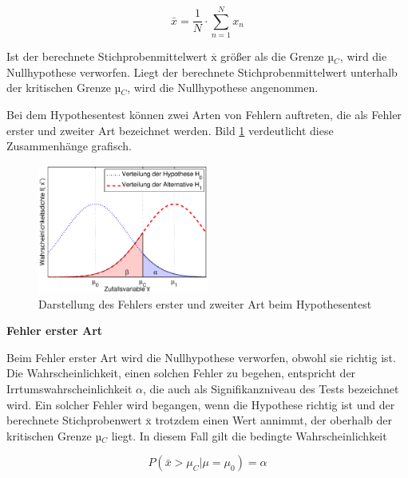 \begin{equation}\label{eq:sixfiftysix}
\bar{x}=\dfrac{1}{N} \cdot \sum _{n=1}^{N}x_{n}
\end{equation}

\noindent Ist der berechnete Stichprobenmittelwert $\overline{\mathrm{x}}$ gr\"{o}{\ss}er als die Grenze µ$_{C}$, wird die Nullhypothese verworfen. Liegt der berechnete Stichprobenmittelwert unterhalb der kritischen Grenze µ$_{C}$, wird die Nullhypothese angenommen.\newline

\noindent Bei dem Hypothesentest k\"{o}nnen zwei Arten von Fehlern auftreten, die als Fehler erster und zweiter Art bezeichnet werden. Bild \ref{fig:HypothesentestFehler} verdeutlicht diese Zusammenh\"{a}nge grafisch.

\noindent 
\begin{figure}[H]
  \centerline{\includegraphics[width=0.5\textwidth]{Kapitel6/Bilder/image9}}
  \caption{Darstellung des Fehlers erster und zweiter Art beim Hypothesentest}
  \label{fig:HypothesentestFehler}
\end{figure}

\clearpage

{\selectfont
\noindent\textbf{Fehler erster Art}}\smallskip

\noindent Beim Fehler erster Art wird die Nullhypothese verworfen, obwohl sie richtig ist. Die Wahrscheinlichkeit, einen solchen Fehler zu begehen, entspricht der Irrtumswahrscheinlichkeit $\alpha$, die auch als Signifikanzniveau des Tests bezeichnet wird. Ein solcher Fehler wird begangen, wenn die Hypothese richtig ist und der berechnete Stichprobenwert $\overline{\mathrm{x}}$ trotzdem einen Wert annimmt, der oberhalb der kritischen Grenze µ$_{C}$ liegt. In diesem Fall gilt die bedingte Wahrscheinlichkeit

\begin{equation}\label{eq:sixfiftyseven}
P\left(\bar{x}>\mu _{C} |\mu =\mu _{0} \right)=\alpha
\end{equation}

